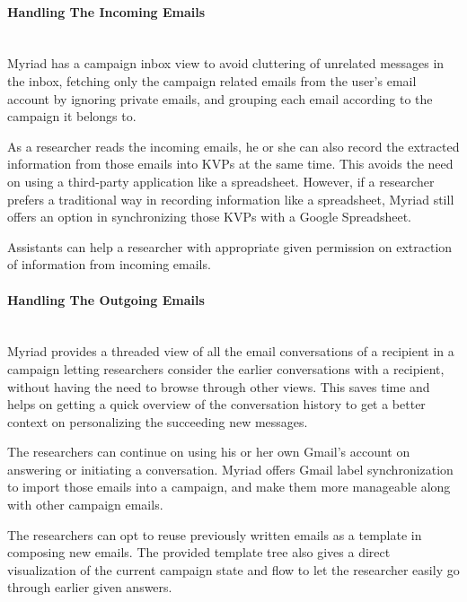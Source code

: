 \paragraph{Handling The Incoming Emails} \mbox{}\\

Myriad has a campaign inbox view to avoid cluttering of unrelated messages in the inbox, fetching only the campaign related emails from the user's email account by ignoring private emails, and grouping each email according to the campaign it belongs to.
\vspace{1cm}

As a researcher reads the incoming emails, he or she can also record the extracted information from those emails into \ac{KVP}s at the same time. This avoids the need on using a third-party application like a spreadsheet. However, if a researcher prefers a traditional way in recording information like a spreadsheet, Myriad still offers an option in synchronizing those \ac{KVP}s with a Google Spreadsheet.
\vspace{1cm}

Assistants can help a researcher with appropriate given permission on extraction of information from incoming emails.

\paragraph{Handling The Outgoing Emails} \mbox{}\\

Myriad provides a threaded view of all the email conversations of a recipient in a campaign letting researchers consider the earlier conversations with a recipient, without having the need to browse through other views. This saves time and helps on getting a quick overview of the conversation history to get a better context on personalizing the succeeding new messages.
\vspace{1cm}

The researchers can continue on using his or her own Gmail's account on answering or initiating a conversation. Myriad offers Gmail label synchronization to import those emails into a campaign, and make them more manageable along with other campaign emails.
\vspace{1cm}

The researchers can opt to reuse previously written emails as a template in composing new emails. The provided template tree also gives a direct visualization of the current campaign state and flow to let the researcher easily go through earlier given answers.
\vspace{1cm}

